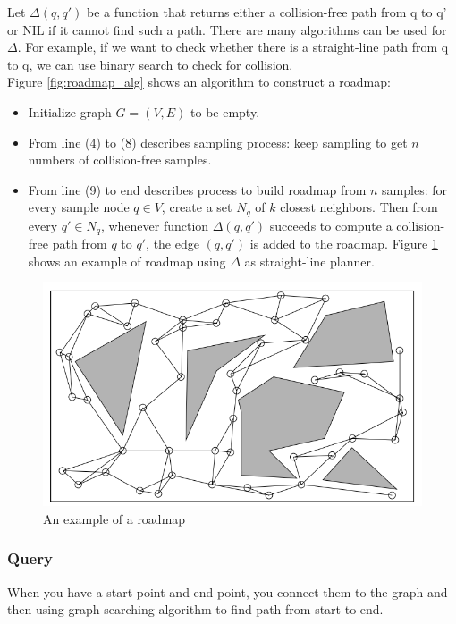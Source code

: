 \documentclass[11pt]{article}
\begin{document}
Let $\Delta(q, q')$ be a function that returns either a collision-free path from q to q' or NIL if it cannot find such a path. There are many algorithms can be used for $\Delta$. For example, if we want to check whether there is a straight-line path from q to q, we can use binary search to check for collision.\\
Figure \ref{fig:roadmap_alg} shows an algorithm to construct a roadmap:
\begin{itemize}
\item Initialize graph $G=(V,E)$ to be empty.
\item From line (4) to (8) describes sampling process: keep sampling to get $n$ numbers of collision-free samples.
\item From line (9) to end describes process to build roadmap from $n$ samples: for every sample node $q\in V$, create a set $N_q$ of $k$ closest neighbors. Then from every $q' \in N_q$, whenever function $\Delta(q, q')$ succeeds to compute a collision-free path from $q$ to $q'$, the edge $(q,q')$ is added to the roadmap. Figure \ref{fig:roadmap_example} shows an example of roadmap using $\Delta$ as straight-line planner.
\end{itemize}

\begin{figure}[h]
\includegraphics{roadmap}
\centering
\caption{An example of a roadmap }
\label{fig:roadmap_example}
\end{figure}

\subsubsection{Query}
When you have a start point and end point, you connect them to the graph and then using graph searching algorithm to find path from start to end.
\end{document}
